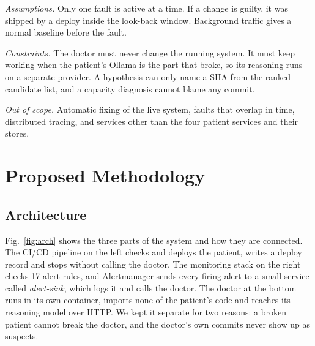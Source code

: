 \documentclass[12pt,onecolumn,draftclsnofoot]{IEEEtran}
\begin{document}
\emph{Assumptions.} Only one fault is active at a time. If a change is guilty, it was shipped by a deploy inside the look-back window. Background traffic gives a normal baseline before the fault.

\emph{Constraints.} The doctor must never change the running system. It must keep working when the patient's Ollama is the part that broke, so its reasoning runs on a separate provider. A hypothesis can only name a SHA from the ranked candidate list, and a capacity diagnosis cannot blame any commit.

\emph{Out of scope.} Automatic fixing of the live system, faults that overlap in time, distributed tracing, and services other than the four patient services and their stores.

\section{Proposed Methodology}\label{sec:method}

\subsection{Architecture}
Fig.~\ref{fig:arch} shows the three parts of the system and how they are connected. The CI/CD pipeline on the left checks and deploys the patient, writes a deploy record and stops without calling the doctor. The monitoring stack on the right checks 17 alert rules, and Alertmanager sends every firing alert to a small service called \emph{alert-sink}, which logs it and calls the doctor. The doctor at the bottom runs in its own container, imports none of the patient's code and reaches its reasoning model over HTTP. We kept it separate for two reasons: a broken patient cannot break the doctor, and the doctor's own commits never show up as suspects.
\end{document}
